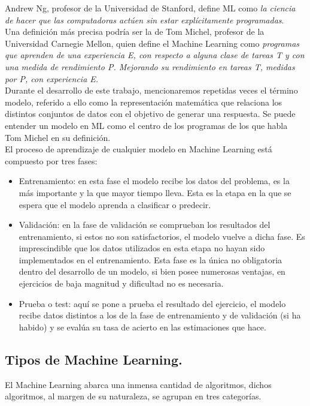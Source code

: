 \documentclass[a4paper,11pt]{article}
\begin{document}
\noindent
Andrew Ng, profesor de la Universidad de Stanford, define ML como \textit{la ciencia de hacer que las computadoras actúen sin estar explícitamente programadas}.\\

\noindent
Una definición más precisa podría ser la de Tom Michel, profesor de la Universidad Carnegie Mellon, quien define el Machine Learning como \textit{programas que aprenden de una experiencia E, con respecto a alguna clase de tareas T y con una medida de rendimiento P. Mejorando su rendimiento en tareas T, medidas por P, con experiencia E.}\\

\noindent
Durante el desarrollo de este trabajo, mencionaremos repetidas veces el término modelo, referido a ello como la representación matemática que relaciona los distintos conjuntos de datos con el objetivo de generar una respuesta. Se puede entender un modelo en ML como el centro de los programas de los que habla Tom Michel en su definición.\\

\noindent
El proceso de aprendizaje de cualquier modelo en Machine Learning está compuesto por tres fases:
\begin{itemize}
\item Entrenamiento: en esta fase el modelo recibe los datos del problema, es la más importante y la que mayor tiempo lleva. Esta es la etapa en la que se espera que el modelo aprenda a clasificar o predecir.
\item Validación: en la fase de validación se comprueban los resultados del entrenamiento, si estos no son satisfactorios, el modelo vuelve a dicha fase. Es imprescindible que los datos utilizados en esta etapa no hayan sido implementados en el entrenamiento. Esta fase es la única no obligatoria dentro del desarrollo de un modelo, si bien posee numerosas ventajas, en ejercicios de baja magnitud y dificultad no es necesaria.
\item Prueba o test: aquí se pone a prueba el resultado del ejercicio, el modelo recibe datos distintos a los de la fase de entrenamiento y de validación (si ha habido) y se evalúa su tasa de acierto en las estimaciones que hace.
\end{itemize}

\subsection{Tipos de Machine Learning.}
El Machine Learning abarca una inmensa cantidad de algoritmos, dichos algoritmos, al margen de su naturaleza, se agrupan en tres categorías.
\end{document}
